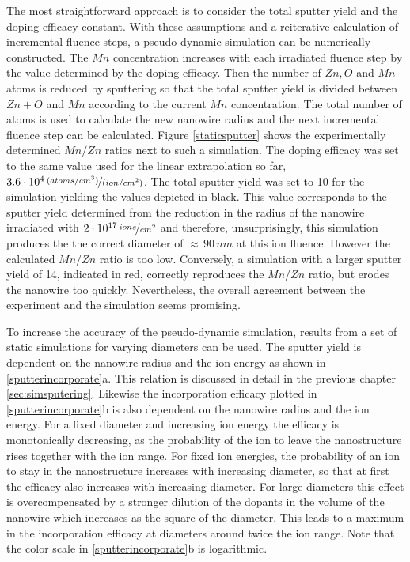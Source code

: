 The most straightforward approach is to consider the total sputter yield and the doping efficacy constant. With these assumptions and a reiterative calculation of incremental fluence steps, a pseudo-dynamic simulation can be numerically constructed. The $Mn$ concentration increases with each irradiated fluence step by the value determined by the doping efficacy. Then the number of $Zn, O$ and $Mn$ atoms is reduced by sputtering so that the total sputter yield is divided between $Zn+O$ and $Mn$ according to the current $Mn$ concentration. The total number of atoms is used to calculate the new nanowire radius and the next incremental fluence step can be calculated. Figure \ref{staticsputter} shows the experimentally determined $Mn/Zn$ ratios next to such a simulation. The doping efficacy was set to the same value used for the linear extrapolation so far, $3.6\cdot10^4\,\nicefrac{(atoms/cm^3)}{(ion/cm^2)}$. The total sputter yield was set to 10 for the simulation yielding the values depicted in black. This value corresponds to the sputter yield determined from the reduction in the radius of the nanowire irradiated with $2\cdot10^{17}\,\nicefrac{ions}{cm^2}$ and therefore, unsurprisingly, this simulation produces the the correct diameter of $\approx\,90\,nm$ at this ion fluence. However the calculated $Mn/Zn$ ratio is too low. Conversely, a simulation with a larger sputter yield of 14, indicated in red, correctly reproduces the $Mn/Zn$ ratio, but erodes the nanowire too quickly. Nevertheless, the overall agreement between the experiment and the simulation seems promising.

To increase the accuracy of the pseudo-dynamic simulation, results from a set of static simulations for varying diameters can be used. The sputter yield is dependent on the nanowire radius and the ion energy as shown in \ref{sputterincorporate}a. This relation is discussed in detail in the previous chapter \ref{sec:simsputering}. Likewise the incorporation efficacy plotted in \ref{sputterincorporate}b is also dependent on the nanowire radius and the ion energy. For a fixed diameter and increasing ion energy the efficacy is monotonically decreasing, as the probability of the ion to leave the nanostructure rises together with the ion range. For fixed ion energies, the probability of an ion to stay in the nanostructure increases with increasing diameter, so that at first the efficacy also increases with increasing diameter. For large diameters this effect is overcompensated by a stronger dilution of the dopants in the volume of the nanowire which increases as the square of the diameter. This leads to a maximum in the incorporation efficacy at diameters around twice the ion range. Note that the color scale in \ref{sputterincorporate}b is logarithmic.


